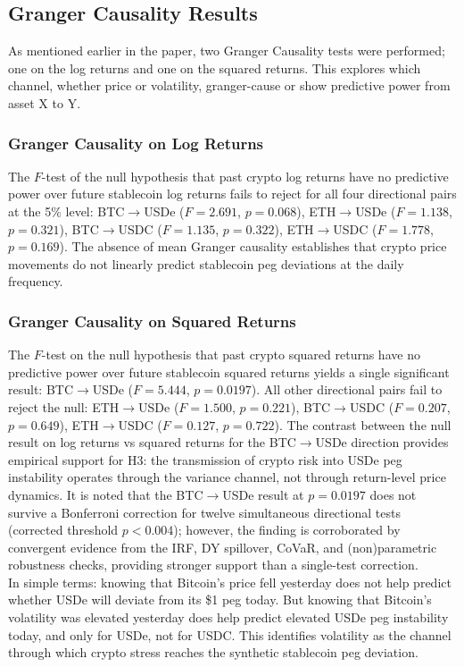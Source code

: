 \documentclass[12pt,a4paper,titlepage,oneside,english]{article}
\begin{document}
\subsection{Granger Causality Results}
As mentioned earlier in the paper, two Granger Causality tests were performed; one on the log returns and one on the squared returns. This explores which channel, whether price or volatility,  granger-cause or show predictive power from asset X to Y.
\subsubsection{Granger Causality on Log Returns}
The $F$-test of the null hypothesis that past
crypto log returns have no predictive power over future stablecoin log returns fails
to reject for all four directional pairs at the 5\% level: BTC$\to$USDe
($F = 2.691$, $p = 0.068$), ETH$\to$USDe ($F = 1.138$, $p = 0.321$),
BTC$\to$USDC ($F = 1.135$, $p = 0.322$), ETH$\to$USDC ($F = 1.778$, $p = 0.169$).
The absence of mean Granger causality establishes that crypto price
movements do not linearly predict stablecoin peg deviations at the daily frequency.
\subsubsection{Granger Causality on Squared Returns}
The $F$-test on the null hypothesis that past crypto squared returns have no predictive power over future stablecoin squared returns yields a single significant result: BTC$\to$USDe ($F = 5.444$, $p = 0.0197$).
All other directional pairs fail to reject the null: ETH$\to$USDe ($F = 1.500$,
$p = 0.221$), BTC$\to$USDC ($F = 0.207$, $p = 0.649$), ETH$\to$USDC ($F = 0.127$,
$p = 0.722$). The contrast between the null result on log returns vs squared returns for the BTC$\to$USDe direction provides empirical support for H3: the transmission of crypto risk into USDe peg instability
operates through the variance channel, not through return-level price dynamics. It is
noted that the BTC$\to$USDe result at $p = 0.0197$ does not survive a Bonferroni
correction for twelve simultaneous directional tests (corrected threshold $p < 0.004$);
however, the finding is corroborated by convergent evidence from the IRF, DY spillover,
CoVaR, and (non)parametric robustness checks, providing stronger support than a single-test correction.\\
In simple terms: knowing that Bitcoin's price fell yesterday does not help predict
whether USDe will deviate from its \$1 peg today. But knowing that Bitcoin's
volatility was elevated yesterday does help predict elevated USDe peg instability
today, and only for USDe, not for USDC. This identifies volatility as the channel
through which crypto stress reaches the synthetic stablecoin peg deviation.
\end{document}
